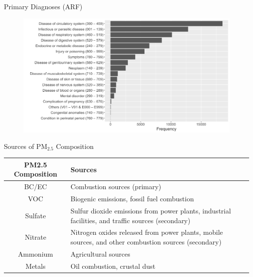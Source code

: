 \documentclass[handout]{beamer} %
\begin{document}
\begin{frame}{Primary Diagnoses (ARF)}
    \begin{figure}
        \centering
        \includegraphics[width=\textwidth]{img/appendix/Aim3/arf_pri.png}
    \end{figure}
\end{frame}

\begin{frame}{Sources of PM$_{2.5}$ Composition}
    \begin{table}
    \centering
    \begin{tabular}{|c|p{}|}
        \hline
        \textbf{PM2.5 Composition} & \textbf{Sources}  \\
        \hline
        BC/EC & Combustion sources (primary) \\
        \hline
        VOC & Biogenic emissions, fossil fuel combustion \\
        \hline
        Sulfate &  Sulfur dioxide emissions from power plants, industrial facilities, and traffic sources (secondary) \\
        \hline
        Nitrate & Nitrogen oxides released from power plants, mobile sources, and other combustion sources (secondary) \\
        \hline
        Ammonium & Agricultural sources \\
        \hline 
        Metals &  Oil combustion, crustal dust \\
        \hline
    \end{tabular}
\end{table}
\end{frame}
\end{document}
